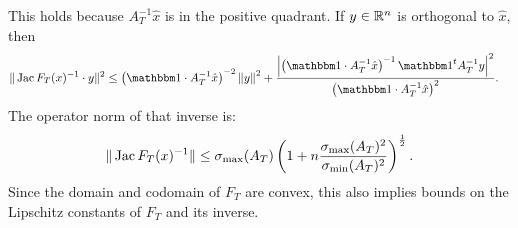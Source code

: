 \documentclass[a4paper]{article}
\begin{document}
        This holds because $A_{T}^{-1} \hat x$ is in the positive quadrant.
        If $y \in {\mathbb R}^{n}$ is orthogonal to $\hat x$, then 
        \begin{align*}
            \| \Jacobian F_T(x)^{-1} \cdot y \|^{2}
            &\leq 
            \left( \vecone \cdot A_{T}^{-1} \hat x \right)^{-2}
            \left\| 
                y
            \right\|^{2}
            +
            \frac{ 
            \left| 
                \left( \vecone \cdot A_{T}^{-1} \hat x \right)^{-1}
                \vecone^{t} A_{T}^{-1} y 
            \right|^{2}
            }{
            \left( \vecone \cdot A_{T}^{-1} \hat x \right)^{2}
            }
            .
        \end{align*}
        The operator norm of that inverse is:
        \begin{align*}
            \| \operatorname{{\rm Jac}} F_T(x)^{-1} \|
            \leq 
            \sigma_{\max}( A_{T} )
            \left( 1 + n \frac{ \sigma_{\max}(A_{T})^{2} }{ \sigma_{\min}(A_{T})^{2} } \right)^{\frac 1 2}
            .
        \end{align*}
        Since the domain and codomain of $F_{T}$ are convex, 
        this also implies bounds on the Lipschitz constants of $F_{T}$ and its inverse. 
\end{document}
